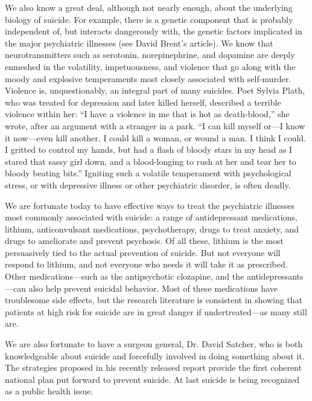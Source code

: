 \documentclass[11pt]{article}
\begin{document}
We also know a great deal, although not nearly enough, about the underlying biology of suicide. For example, there is a genetic component that is probably independent of, but interacts dangerously with, the genetic factors implicated in the major psychiatric illnesses (see David Brent’s article). We know that neurotransmitters such as serotonin, norepinephrine, and dopamine are deeply enmeshed in the volatility, impetuousness, and violence that go along with the moody and explosive temperaments most closely associated with self-murder. Violence is, unquestionably, an integral part of many suicides. Poet Sylvia Plath, who was treated for depression and later killed herself, described a terrible violence within her: “I have a violence in me that is hot as death-blood,” she wrote, after an argument with a stranger in a park. “I can kill myself or—I know it now—even kill another. I could kill a woman, or wound a man. I think I could. I gritted to control my hands, but had a ﬂash of bloody stars in my head as I stared that sassy girl down, and a blood-longing to rush at her and tear her to bloody beating bits.” Igniting such a volatile temperament with psychological stress, or with depressive illness or other psychiatric disorder, is often deadly.

We are fortunate today to have effective ways to treat the psychiatric illnesses most commonly associated with suicide: a range of antidepressant medications, lithium, anticonvulsant medications, psychotherapy, drugs to treat anxiety, and drugs to ameliorate and prevent psychosis. Of all these, lithium is the most persuasively tied to the actual prevention of suicide. But not everyone will respond to lithium, and not everyone who needs it will take it as prescribed. Other medications—such as the antipsychotic clozapine, and the antidepressants—can also help prevent suicidal behavior. Most of these medications have troublesome side effects, but the research literature is consistent in showing that patients at high risk for suicide are in great danger if undertreated—as many still are.

We are also fortunate to have a surgeon general, Dr. David Satcher, who is both knowledgeable about suicide and forcefully involved in doing something about it. The strategies proposed in his recently released report provide the ﬁrst coherent national plan put forward to prevent suicide. At last suicide is being recognized as a public health issue.
\end{document}
